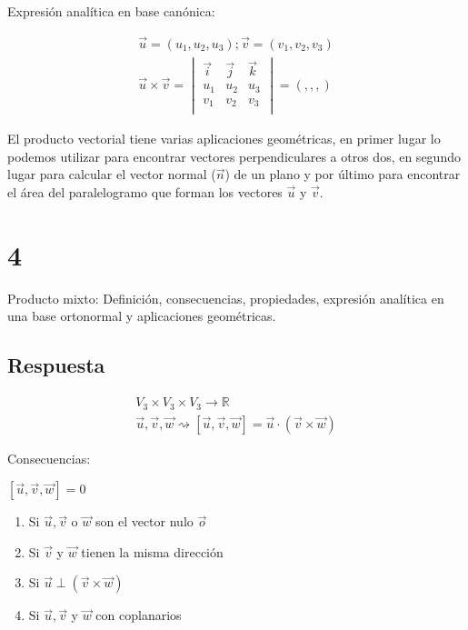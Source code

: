 \documentclass[
	12pt, %
	spanish, %
]{fphw}
\newcommand{\vu}{\vec{u}}
\newcommand{\vv}{\vec{v}}
\newcommand{\vw}{\vec{w}}
\begin{document}
Expresión analítica en base canónica:

\begin{gather*}
	\vec{u}=(u_1,u_2,u_3);\vec{v} =(v_1,v_2,v_3)\\
	\vec{u} \times \vec{v} = 
	\begin{vmatrix}
		\vec{i} & \vec{j} & \vec{k} \\
		u_1 & u_2 & u_3\\
		v_1 & v_2 & v_3 \\
	\end{vmatrix} = ( , , ,)
\end{gather*}

El producto vectorial tiene varias aplicaciones geométricas, en primer lugar lo podemos utilizar para encontrar vectores perpendiculares a otros dos, en segundo lugar para calcular el vector normal ($\vec{n}$) de un plano y por último para encontrar el área del paralelogramo que forman los vectores $\vec{u}$ y $\vec{v}$.



\section*{4}

\begin{problem}
	
Producto mixto: Definición, consecuencias, propiedades, expresión analítica en
una base ortonormal y aplicaciones geométricas.
\end{problem}

\subsection*{Respuesta}

\begin{gather*}
	V_3 \times V_3 \times V_3 \rightarrow \mathbb{R}\\
	\vec{u},\vec{v},\vec{w} \rightsquigarrow [\vec{u},\vec{v},\vec{w}] =  \vec{u} \cdot (\vec{v} \times \vec{w})
\end{gather*}


Consecuencias:

$[\vu,\vv,\vw] = 0$

\begin{enumerate}
	\item Si $\vu, \vv$ o $\vw$ son el vector nulo $\vec{o}$
	\item Si $\vv$ y $\vw$ tienen la misma dirección
	\item Si $\vu \perp (\vv \times \vw)$
	\item Si $\vu, \vv$ y $\vw$ con coplanarios
\end{enumerate}
\end{document}
